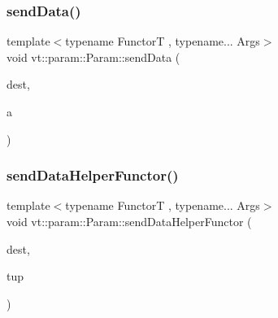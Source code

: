 \subsubsection{\texorpdfstring{send\+Data()}{sendData()}\hspace{0.1cm}{\footnotesize\ttfamily [7/7]}}
{\footnotesize\ttfamily template$<$typename FunctorT , typename... Args$>$ \\
void vt\+::param\+::\+Param\+::send\+Data (\begin{DoxyParamCaption}\item[{\hyperlink{namespacevt_a866da9d0efc19c0a1ce79e9e492f47e2}{Node\+Type} const \&}]{dest,  }\item[{Args \&\&...}]{a }\end{DoxyParamCaption})\hspace{0.3cm}{\ttfamily [inline]}}

\mbox{\label{structvt_1_1param_1_1_param_a51452ecb0d885e4a3755df33657d613e}} 
\subsubsection{\texorpdfstring{send\+Data\+Helper\+Functor()}{sendDataHelperFunctor()}}
{\footnotesize\ttfamily template$<$typename FunctorT , typename... Args$>$ \\
void vt\+::param\+::\+Param\+::send\+Data\+Helper\+Functor (\begin{DoxyParamCaption}\item[{\hyperlink{namespacevt_a866da9d0efc19c0a1ce79e9e492f47e2}{Node\+Type} const \&}]{dest,  }\item[{std\+::tuple$<$ Args... $>$ \&\&}]{tup }\end{DoxyParamCaption})\hspace{0.3cm}{\ttfamily [inline]}}

\mbox{\label{structvt_1_1param_1_1_param_acad0af6824812d028e5e0f088b4757dd}} 
